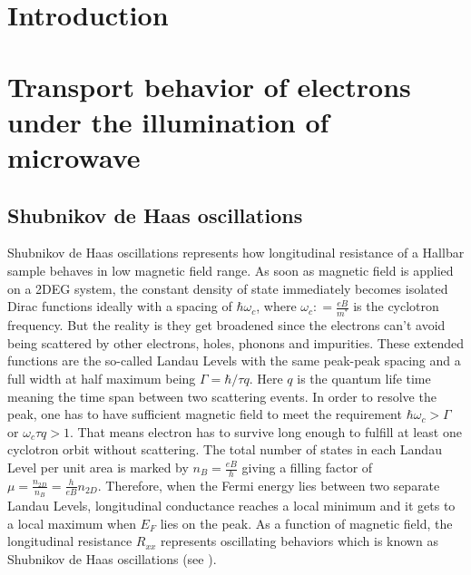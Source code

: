 \documentclass[12pt]{ruthesis}
\begin{document}
\chapter{Introduction}\label{Intro}


\chapter{Transport behavior of electrons under the illumination of microwave}\label{Transport}

\section{Shubnikov de Haas oscillations}\label{SdHO}
Shubnikov de Haas oscillations represents how longitudinal resistance of a Hallbar sample behaves in low magnetic field range.
As soon as magnetic field is applied on a 2DEG system, the constant density of state immediately becomes isolated Dirac functions ideally with a spacing of $\hbar\omega_{c}$, where $\omega_{c}: =\frac{eB}{m^{*}}$ is the cyclotron frequency.
But the reality is they get broadened since the electrons can't avoid being scattered by other electrons, holes, phonons and impurities.
These extended functions are the so-called Landau Levels with the same peak-peak spacing and a full width at half maximum being $\Gamma=\hbar/\tau q$.
Here $q$ is the quantum life time meaning the time span between two scattering events.
In order to resolve the peak, one has to have sufficient magnetic field to meet the requirement $\hbar\omega_{c}>\Gamma$ or $\omega_{c}\tau q>1$.
That means electron has to survive long enough to fulfill at least one cyclotron orbit without scattering.
The total number of states in each Landau Level per unit area is marked by $n_{B}=\frac{eB}{h}$ giving a filling factor of $\mu =\frac{n_{2D}}{n_{B}}=\frac{h}{eB}n_{2D}$.
Therefore, when the Fermi energy lies between two separate Landau Levels, longitudinal conductance reaches a local minimum and it gets to a local maximum when $E_{F}$ lies on the peak.
As a function of magnetic field, the longitudinal resistance $R_{xx}$ represents oscillating behaviors which is known as Shubnikov de Haas oscillations (see ).
\end{document}
